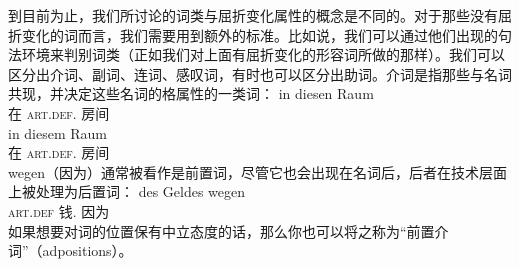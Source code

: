 到目前为止，我们所讨论的词类与屈折变化属性的概念是不同的。对于那些没有屈折变化的词而言，我们需要用到额外的标准。比如说，我们可以通过他们出现的句法环境来判别词类（正如我们对上面有屈折变化的形容词所做的那样）。我们可以区分出介词、副词、连词、感叹词，有时也可以区分出助词。介词是指那些与名词共现，并决定这些名词的格属性的一类词：
\eal
\ex 
\gll in diesen Raum\\
	 在 \textsc{art}.\textsc{def}.\acc{} 房间\\
\ex 
\gll in diesem Raum\\
	 在 \textsc{art}.\textsc{def}.\dat{} 房间\\
\zl
wegen（因为）通常被看作是前置词，尽管它也会出现在名词后，后者在技术层面上被处理为后置词：
\ea
\gll des Geldes wegen\\
	 \textsc{art}.\textsc{def} 钱.\gen{} 因为\\
\z
如果想要对词的位置保有中立态度的话，那么你也可以将之称为“前置介词”（adpositions）。

